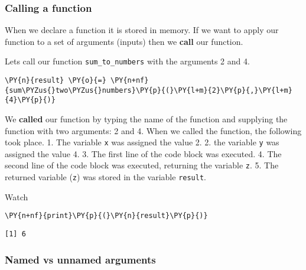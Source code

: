     \hypertarget{calling-a-function}{%
\subsubsection{Calling a function}\label{calling-a-function}}

When we declare a function it is stored in memory. If we want to apply
our function to a set of arguments (inputs) then we \textbf{call} our
function.

Lets call our function \texttt{sum\_to\_numbers} with the arguments 2
and 4.

    \begin{tcolorbox}[breakable, size=fbox, boxrule=1pt, pad at break*=1mm,colback=cellbackground, colframe=cellborder]
\begin{Verbatim}[commandchars=\\\{\}]
\PY{n}{result} \PY{o}{=} \PY{n+nf}{sum\PYZus{}two\PYZus{}numbers}\PY{p}{(}\PY{l+m}{2}\PY{p}{,}\PY{l+m}{4}\PY{p}{)}
\end{Verbatim}
\end{tcolorbox}

    We \textbf{called} our function by typing the name of the function and
supplying the function with two arguments: 2 and 4. When we called the
function, the following took place. 1. The variable \texttt{x} was
assigned the value 2. 2. the variable \texttt{y} was assigned the value
4. 3. The first line of the code block was executed. 4. The second line
of the code block was executed, returning the variable \texttt{z}. 5.
The returned variable (\texttt{z}) was stored in the variable
\texttt{result}.

Watch

    \begin{tcolorbox}[breakable, size=fbox, boxrule=1pt, pad at break*=1mm,colback=cellbackground, colframe=cellborder]
\begin{Verbatim}[commandchars=\\\{\}]
\PY{n+nf}{print}\PY{p}{(}\PY{n}{result}\PY{p}{)}
\end{Verbatim}
\end{tcolorbox}

    \begin{Verbatim}[commandchars=\\\{\}]
[1] 6
    \end{Verbatim}

    \hypertarget{named-vs-unnamed-arguments}{%
\subsubsection{Named vs unnamed
arguments}\label{named-vs-unnamed-arguments}}

